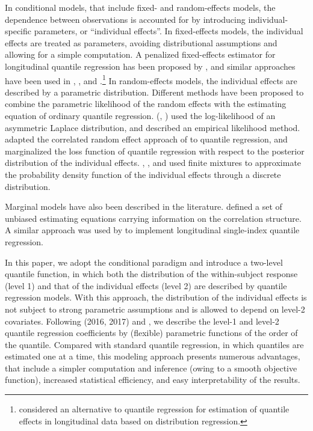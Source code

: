 \documentclass[12pt]{article}
\begin{document}
In conditional models, that include fixed- and random-effects models, 
the dependence between observations is accounted for by introducing individual-specific parameters,
or ``individual effects''. In fixed-effects models, the individual effects are treated as parameters, avoiding
distributional assumptions and allowing for a simple computation. 
A penalized fixed-effects estimator for longitudinal quantile regression has been proposed by \cite{koenker2004}, 
and similar approaches have been used in \cite{lamarche}, \cite{canay}, and \cite{kato}.\footnote{\cite{cfw18} considered an alternative to quantile regression for estimation of quantile effects in longitudinal data based on  distribution regression.}
In random-effects models, the individual effects are described by a parametric distribution.
Different methods have been proposed to combine the parametric likelihood of the random effects with the estimating equation 
of ordinary quantile regression. \citeauthor{geraci} (\citeyear{geraci}, \citeyear{geraci2}) used the log-likelihood 
of an asymmetric Laplace distribution, and \cite{kim} described an empirical likelihood method. 
\cite{ad08} adapted the correlated random effect approach of \cite{c84} to quantile regression, and \cite{arellano} marginalized the loss function of quantile regression with respect to the posterior distribution 
of the individual effects. \cite{farcomeni}, \cite{marino}, and \cite{alfo} used finite mixtures to approximate the probability density function 
of the individual effects through a discrete distribution.


Marginal models have also been described in the literature.
\cite{leng} defined a set of unbiased estimating equations carrying information on the correlation structure.
A similar approach was used by \cite{zhao} to implement longitudinal single-index quantile regression.


In this paper, we adopt the conditional paradigm and introduce a two-level quantile function, in which
both the distribution of the within-subject response (level 1) and that
of the individual effects (level 2) are described by quantile regression models. 
With this approach, the distribution of the individual effects is not subject to strong parametric 
assumptions and is allowed to depend on level-2 covariates.
Following \citeauthor{iqr} (2016, 2017) and \cite{yang}, we describe the level-1 and level-2 quantile
regression coefficients by (flexible) parametric functions of the order of the quantile.
Compared with standard quantile regression, in which quantiles are estimated one at a time, this modeling approach 
presents numerous advantages, that include a simpler computation and inference
(owing to a smooth objective function), increased statistical efficiency, and easy interpretability of the results.
\end{document}

